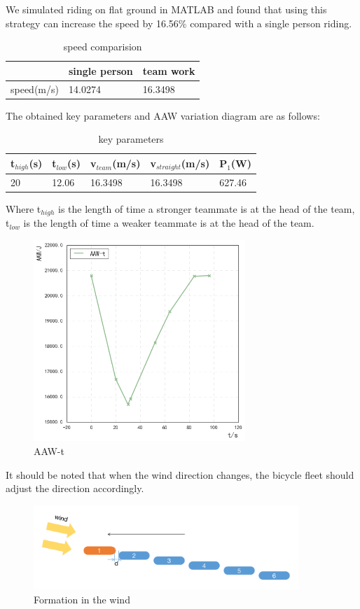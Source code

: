\documentclass{mcmthesis}
\begin{document}
\par
We simulated riding on flat ground in MATLAB and found that using this strategy can increase the speed by 16.56\% compared with a single person riding.
\begin{table}[H]
\centering
\caption{speed comparision}
\begin{tabular}{lll}
\hline
           & single person & team work \\ \hline
speed(m/s) & 14.0274       & 16.3498   \\ \hline
\end{tabular}
\end{table}
\par
The obtained key parameters and AAW variation diagram are as follows:
\begin{table}[H]
\centering
\caption{key parameters}
\begin{tabular}{lllll}
\hline
t$_{high}$(s) & t$_{low}$(s) & v$_{team}$(m/s) & v$_{straight}$(m/s) & P$_{1}$(W)  \\ \hline
20       & 12.06   & 16.3498    & 16.3498        & 627.46 \\ \hline
\end{tabular}
\end{table}
\par
Where t$_{high}$ is the length of time a stronger teammate is at the head of the team, t$_{low}$ is the length of time a weaker teammate is at the head of the team.

\begin{figure}[H]
\small
\centering
\includegraphics[width=8cm]{mcmthesis/figures/aaw-t.png}
\caption{AAW-t} 
\end{figure}

\par
It should be noted that when the wind direction changes, the bicycle fleet should adjust the direction accordingly.
\begin{figure}[H]
\small
\centering
\includegraphics[width=10cm]{mcmthesis/figures/wind.png}
\caption{Formation in the wind} 
\end{figure}
\end{document}
